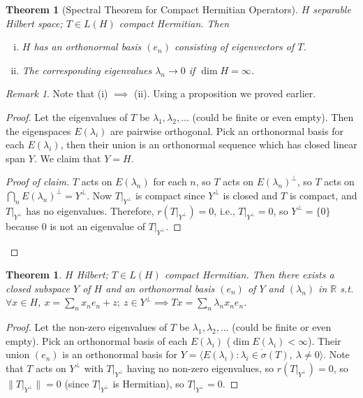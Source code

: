 \documentclass{article}
\theoremstyle{definition}
\theoremstyle{remark}
\newtheorem{rem}{Remark}
\theoremstyle{plain}
\newtheorem{thm}[defn]{Theorem}
\newcommand{\RR}{\mathbb{R}}
\begin{document}
\begin{thm}[Spectral Theorem for Compact Hermitian Operators]
    $H$ separable Hilbert space; $T\in L(H)$ compact Hermitian. Then
    \begin{enumerate}[(i)]
        \item $H$ has an orthonormal basis $(e_n)$ consisting of eigenvectors of $T$.
        \item The corresponding eigenvalues $\lambda_n\to 0$ if $\dim H=\infty$.
    \end{enumerate}
\end{thm}
\begin{rem}
Note that (i) $\implies$ (ii). Using a proposition we proved earlier.
\end{rem}
\begin{proof}
    Let the eigenvalues of $T$ be $\lambda_1,\lambda_2,...$ (could be finite or even empty). Then the eigenspaces $E(\lambda_i)$ are pairwise orthogonal. Pick an orthonormal basis for each $E(\lambda_i)$, then their union is an orthonormal sequence which has closed linear span $Y$. We claim that $Y=H$.
    \begin{proof}[Proof of claim]
        $T$ acts on $E(\lambda_n)$ for each $n$, so $T$ acts on $E(\lambda_n)^\perp$, so $T$ acts on $\bigcap_nE(\lambda_n)^\perp=Y^\perp$. Now $T|_{Y^\perp}$ is compact since $Y^\perp$ is closed and $T$ is compact, and $T|_{Y^\perp}$ has no eigenvalues. Therefore, $r(T|_{Y^\perp})=0$, i.e., $T|_{Y^\perp}=0$, so $Y^\perp=\{0\}$ because $0$ is not an eigenvalue of $T|_{Y^\perp}$.
    \end{proof}
\end{proof}
\begin{thm}
    $H$ Hilbert; $T\in L(H)$ compact Hermitian. Then there exists a closed subspace $Y$ of $H$ and an orthonormal basis $(e_n)$ of $Y$ and $(\lambda_n)$ in $\RR$ s.t. $\forall x\in H$, $x=\sum_nx_ne_n+z;\ z\in Y^\perp\implies Tx=\sum_n\lambda_nx_ne_n$.
\end{thm}
\begin{proof}
    Let the non-zero eigenvalues of $T$ be $\lambda_1,\lambda_2,...$ (could be finite or even empty). Pick an orthonormal basis of each $E(\lambda_i)$ ($\dim E(\lambda_i)<\infty$). Their union $(e_n)$ is an orthonormal basis for $Y=\overline{\langle E(\lambda_i):\lambda_i\in\sigma(T),\ \lambda\neq0\rangle}$. Note that $T$ acts on $Y^\perp$ with $T|_{Y^\perp}$ having no non-zero eigenvalues, so $r(T|_{Y^\perp})=0$, so $\|T|_{Y^\perp}\|=0$ (since $T|_{Y^\perp}$ is Hermitian), so $T|_{Y^\perp}=0$.
\end{proof}
\end{document}

